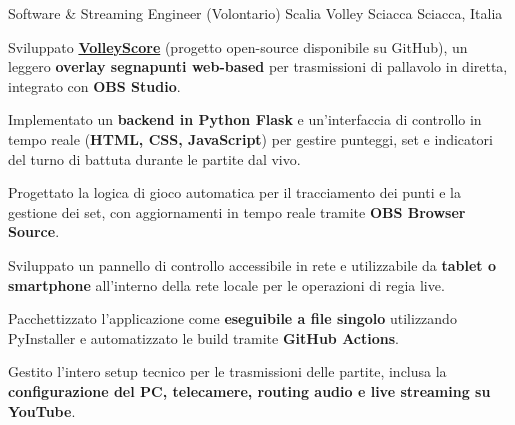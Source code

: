 
\begin{cventries}

  \cventry
    {Software \& Streaming Engineer (Volontario)}
    {Scalia Volley Sciacca}
    {Sciacca, Italia}
    {}
    {
      \begin{cvitems}
        \item {Sviluppato \href{https://github.com/Reccardenee/VolleyScore}{\textbf{VolleyScore}} (progetto open-source disponibile su GitHub), un leggero \textbf{overlay segnapunti web-based} per trasmissioni di pallavolo in diretta, integrato con \textbf{OBS Studio}.}
        \item {Implementato un \textbf{backend in Python Flask} e un'interfaccia di controllo in tempo reale (\textbf{HTML, CSS, JavaScript}) per gestire punteggi, set e indicatori del turno di battuta durante le partite dal vivo.}
        \item {Progettato la logica di gioco automatica per il tracciamento dei punti e la gestione dei set, con aggiornamenti in tempo reale tramite \textbf{OBS Browser Source}.}
        \item {Sviluppato un pannello di controllo accessibile in rete e utilizzabile da \textbf{tablet o smartphone} all'interno della rete locale per le operazioni di regia live.}
        \item {Pacchettizzato l'applicazione come \textbf{eseguibile a file singolo} utilizzando PyInstaller e automatizzato le build tramite \textbf{GitHub Actions}.}
        \item {Gestito l'intero setup tecnico per le trasmissioni delle partite, inclusa la \textbf{configurazione del PC, telecamere, routing audio e live streaming su YouTube}.}
      \end{cvitems}
    }

\end{cventries}